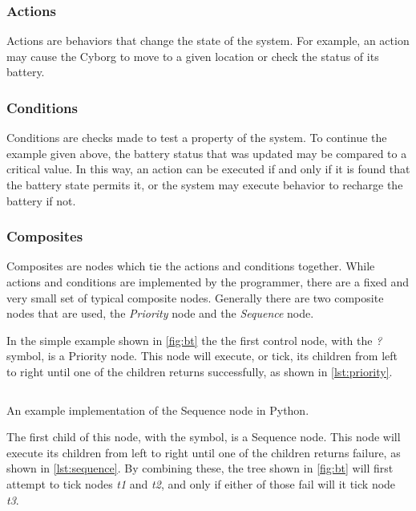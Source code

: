 \documentclass[\rootfolder/main.tex]{subfiles}
\begin{document}
\subsubsection{Actions}

Actions are behaviors that change the state of the system.
For example, an action may cause the Cyborg to move to a given location or check the status of its battery.

\subsubsection{Conditions}

Conditions are checks made to test a property of the system.
To continue the example given above, the battery status that was updated may be compared to a critical value.
In this way, an action can be executed if and only if it is found that the battery state permits it, or the system may execute behavior to recharge the battery if not.

\subsubsection{Composites}

Composites are nodes which tie the actions and conditions together.
While actions and conditions are implemented by the programmer, there are a fixed and very small set of typical composite nodes.
Generally there are two composite nodes that are used, the \emph{Priority} node and the \emph{Sequence} node.

In the simple example shown in \cref{fig:bt} the the first control node, with the \emph{?} symbol, is a Priority node.
This node will execute, or tick, its children from left to right until one of the children returns successfully, as shown in \cref{lst:priority}.

\begin{listing}
    \inputminted{python}{\rootfolder/Chapters/Chapter2/Listings/sequence.py}
    \caption{An example implementation of the Sequence node in Python.\label{lst:sequence}}
\end{listing}

The first child of this node, with the \emph{\rightarrow} symbol, is a Sequence node.
This node will execute its children from left to right until one of the children returns failure, as shown in \cref{lst:sequence}.
By combining these, the tree shown in \cref{fig:bt} will first attempt to tick nodes \emph{t1} and \emph{t2}, and only if either of those fail will it tick node \emph{t3}.
\end{document}
